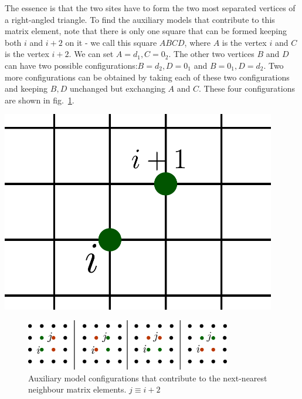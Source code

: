 \documentclass{report}
\numberwithin{equation}{section}
\begin{document}
\par\noindent
\begin{minipage}{0.6\textwidth}
The essence is that the two sites have to form the two most separated vertices of a right-angled triangle. To find the auxiliary models that contribute to this matrix element, note that there is only one square that can be formed keeping both \(i\) and \(i+2\) on it - we call this square \(ABCD\), where \(A\) is the vertex \(i\) and \(C\) is the vertex \(i+2\). We can set \(A=d_1, C=0_2\). The other two vertices \(B\) and \(D\) can have two possible configurations:\(B=d_2,D=0_1\) and \(B=0_1,D=d_2\). Two more configurations can be obtained by taking each of these two configurations and keeping \(B,D\) unchanged but exchanging \(A\) and \(C\). These four configurations are shown in fig.~\ref{nn-configs}. 
\end{minipage}
\hspace*{\fill}
\begin{minipage}{0.35\textwidth}
	\centering
	\includegraphics[width=0.9\textwidth]{../figures/next-near.pdf}
	\label{next-near}
\end{minipage}

\begin{figure}[!htb]
	\centering
	\includegraphics[width=0.8\textwidth]{../figures/nn-offdiagonal_contributors.pdf}
	\caption{Auxiliary model configurations that contribute to the next-nearest neighbour matrix elements. \(j \equiv i+2\)}
	\label{nn-configs}
\end{figure}
\end{document}
